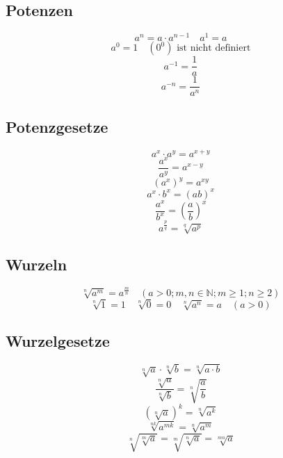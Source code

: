\subsection{Potenzen}
\[ \boxed{a^n = a \cdot a^{n-1} \quad a^1 = a} \]
\[ \boxed{a^0 = 1 \quad \left(0^0\right)\text{ ist nicht definiert}} \]
\[ \boxed{a^{-1} = \frac{1}{a}} \]
\[ \boxed{a^{-n} = \frac{1}{a^n}} \]

\subsection{Potenzgesetze}
\[ \boxed{a^x \cdot a^y = a^{x+y}} \]
\[ \boxed{\frac{a^x}{a^y} = a^{x-y}} \]
\[ \boxed{(a^x)^y = a^{xy}} \]
\[ \boxed{a^x \cdot b^x = \left(ab\right)^x} \]
\[ \boxed{\frac{a^x}{b^x} = \left(\frac{a}{b}\right)^x} \]
\[ \boxed{a^{\frac{p}{q}} = \sqrt[q]{a^p}} \]

\subsection{Wurzeln}
\[ \boxed{\sqrt[n]{a^m} = a^{\frac{m}{n}} \quad \left(a>0; m, n \in \mathbb{N}; 
m \geq 1; n \geq 2\right)} \]
\[ \boxed{\sqrt[n]{1}=1 \quad \sqrt[n]{0}=0 \quad \sqrt[n]{a^n}=a 
\quad \left(a>0\right)} \]

\subsection{Wurzelgesetze}
\[ \boxed{\sqrt[n]{a}\cdot \sqrt[n]{b}=\sqrt[n]{a\cdot b}} \]
\[ \boxed{\frac{\sqrt[n]{a}}{\sqrt[n]{b}}=\sqrt[n]{\frac{a}{b}}} \]
\[ \boxed{\left(\sqrt[n]{a}\right)^k=\sqrt[n]{a^k}} \]
\[ \boxed{\sqrt[nk]{a^{mk}}=\sqrt[n]{a^m}} \]
\[ \boxed{\sqrt[n]{\sqrt[m]{a}}=\sqrt[m]{\sqrt[n]{a}}=\sqrt[mn]{a}} \]

